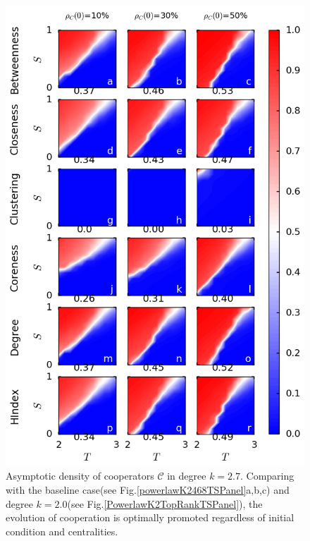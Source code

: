 \documentclass[preprint,12pt,3p]{elsarticle}
\begin{document}
\begin{figure}[htbp]
\centering
\includegraphics[width=13cm]{PowerlawK2.7TopRankTSPanel.png}

\caption{Asymptotic density of cooperators $\mathcal{C}$ in degree $k=2.7$.
Comparing with the baseline case(see Fig.\ref{powerlawK2468TSPanel}a,b,c) and
degree $k=2.0$(see Fig.\ref{PowerlawK2TopRankTSPanel}),
the evolution of cooperation is optimally promoted regardless of initial condition and centralities.}
\label{PowerlawK2.7TopRankTSPanel}
\end{figure}
\end{document}

